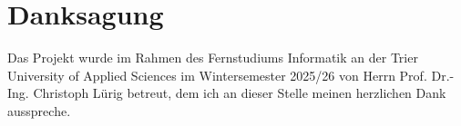 
\chapter*{Danksagung}
Das Projekt wurde im Rahmen des Fernstudiums Informatik an der Trier University of Applied Sciences im Wintersemester 2025/26 von Herrn Prof. Dr.-Ing. Christoph Lürig betreut, dem ich an dieser Stelle meinen herzlichen Dank ausspreche.